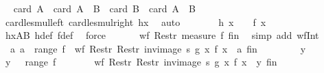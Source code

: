 \begin{isabellebody}
\ \isamarkupfalse%
\ {\isachardoublequoteopen}card\ A\ {\isasymle}\ card\ {\isacharparenleft}{\kern0pt}A\ {\isasymcdots}\ B{\isacharparenright}{\kern0pt}{\isachardoublequoteclose}\ \ {\isachardoublequoteopen}card\ B\ {\isasymle}\ card\ {\isacharparenleft}{\kern0pt}A\ {\isasymcdots}\ B{\isacharparenright}{\kern0pt}{\isachardoublequoteclose}\ \isanewline
\ \ \ \ \ \ \isamarkupfalse%
\ card{\isacharunderscore}{\kern0pt}le{\isacharunderscore}{\kern0pt}smul{\isacharunderscore}{\kern0pt}left\ card{\isacharunderscore}{\kern0pt}le{\isacharunderscore}{\kern0pt}smul{\isacharunderscore}{\kern0pt}right\ hx\ \isamarkupfalse%
\ auto\isanewline
\ \ \ \ \isamarkupfalse%
\ \isamarkupfalse%
\ {\isachardoublequoteopen}h\ x\ {\isasymle}\ {}\ {\isacharasterisk}{\kern0pt}\ f\ x{\isachardoublequoteclose}\ \isamarkupfalse%
\ hxAB\ h{\isacharunderscore}{\kern0pt}def\ f{\isacharunderscore}{\kern0pt}def\ \isamarkupfalse%
\ force\isanewline
\ \ \isamarkupfalse%
\isanewline
\ \ \isamarkupfalse%
\ {\isachardoublequoteopen}wf\ {\isacharparenleft}{\kern0pt}Restr\ {\isacharparenleft}{\kern0pt}measure\ f{\isacharparenright}{\kern0pt}\ {\isacharquery}{\kern0pt}fin{\isacharparenright}{\kern0pt}{\isachardoublequoteclose}\ \isamarkupfalse%
\ {\isacharparenleft}{\kern0pt}simp\ add{\isacharcolon}{\kern0pt}\ wf{\isacharunderscore}{\kern0pt}Int{}{\isacharparenright}{\kern0pt}\isanewline
\ \ \isamarkupfalse%
\ \isamarkupfalse%
\ {\isachardoublequoteopen}{\isasymAnd}\ a{\isachardot}{\kern0pt}\ a\ {\isasymin}\ range\ f\ {\isasymLongrightarrow}\ wf\ {\isacharparenleft}{\kern0pt}Restr\ {\isacharparenleft}{\kern0pt}Restr\ {\isacharparenleft}{\kern0pt}inv{\isacharunderscore}{\kern0pt}image\ s\ g{\isacharparenright}{\kern0pt}\ {\isacharbraceleft}{\kern0pt}x{\isachardot}{\kern0pt}\ f\ x\ {\isacharequal}{\kern0pt}\ a{\isacharbraceright}{\kern0pt}{\isacharparenright}{\kern0pt}\ {\isacharquery}{\kern0pt}fin{\isacharparenright}{\kern0pt}{\isachardoublequoteclose}\isanewline
\ \ \isamarkupfalse%
{\isacharminus}{\kern0pt}\isanewline
\ \ \ \ \isamarkupfalse%
\ y\ \isamarkupfalse%
\ {\isachardoublequoteopen}y\ {\isasymin}\ \ range\ f{\isachardoublequoteclose}\isanewline
\ \ \ \ \isamarkupfalse%
\ \isamarkupfalse%
\ {\isachardoublequoteopen}wf\ {\isacharparenleft}{\kern0pt}Restr\ {\isacharparenleft}{\kern0pt}Restr\ {\isacharparenleft}{\kern0pt}inv{\isacharunderscore}{\kern0pt}image\ s\ g{\isacharparenright}{\kern0pt}\ {\isacharbraceleft}{\kern0pt}x{\isachardot}{\kern0pt}\ f\ x\ {\isacharequal}{\kern0pt}\ y{\isacharbraceright}{\kern0pt}{\isacharparenright}{\kern0pt}\ {\isacharquery}{\kern0pt}fin{\isacharparenright}{\kern0pt}{\isachardoublequoteclose}\isanewline

\end{isabellebody}
